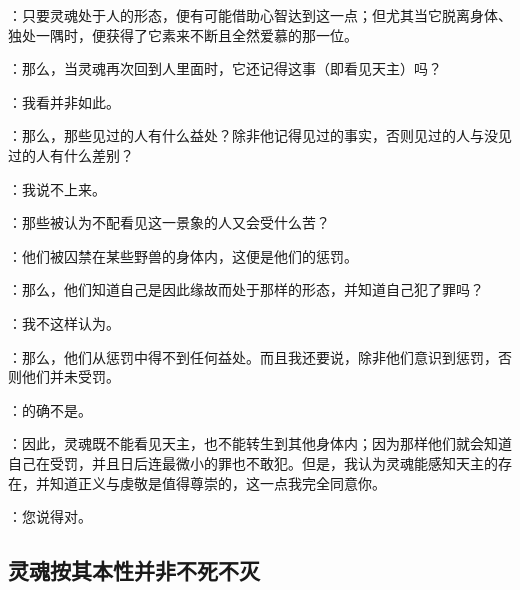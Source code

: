 ：只要灵魂处于人的形态，便有可能借助心智达到这一点；但尤其当它脱离身体、独处一隅时，便获得了它素来不断且全然爱慕的那一位。\par

：那么，当灵魂再次回到人里面时，它还记得这事（即看见天主）吗？\par

：我看并非如此。\par

：那么，那些见过的人有什么益处？除非他记得见过的事实，否则见过的人与没见过的人有什么差别？\par

：我说不上来。\par

：那些被认为不配看见这一景象的人又会受什么苦？\par

：他们被囚禁在某些野兽的身体内，这便是他们的惩罚。\par

：那么，他们知道自己是因此缘故而处于那样的形态，并知道自己犯了罪吗？\par

：我不这样认为。\par

：那么，他们从惩罚中得不到任何益处。而且我还要说，除非他们意识到惩罚，否则他们并未受罚。\par

：的确不是。\par

：因此，灵魂既不能看见天主，也不能转生到其他身体内；因为那样他们就会知道自己在受罚，并且日后连最微小的罪也不敢犯。但是，我认为灵魂能感知天主的存在，并知道正义与虔敬是值得尊崇的，这一点我完全同意你。\par

：您说得对。\par


\subsection{灵魂按其本性并非不死不灭}

\begin{quotation}
\Emph{}
\end{quotation}

